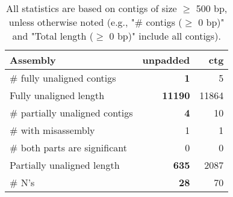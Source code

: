 \documentclass[12pt,a4paper]{article}
\begin{document}
\begin{table}[ht]
\begin{center}
\caption{All statistics are based on contigs of size $\geq$ 500 bp, unless otherwise noted (e.g., "\# contigs ($\geq$ 0 bp)" and "Total length ($\geq$ 0 bp)" include all contigs).}
\begin{tabular}{|l*{2}{|r}|}
\hline
Assembly & unpadded & ctg \\ \hline
\# fully unaligned contigs & {\bf 1} & 5 \\ \hline
Fully unaligned length & {\bf 11190} & 11864 \\ \hline
\# partially unaligned contigs & {\bf 4} & 10 \\ \hline
\hspace{5mm}\# with misassembly & 1 & 1 \\ \hline
\hspace{5mm}\# both parts are significant & 0 & 0 \\ \hline
Partially unaligned length & {\bf 635} & 2087 \\ \hline
\# N's & {\bf 28} & 70 \\ \hline
\end{tabular}
\end{center}
\end{table}
\end{document}
